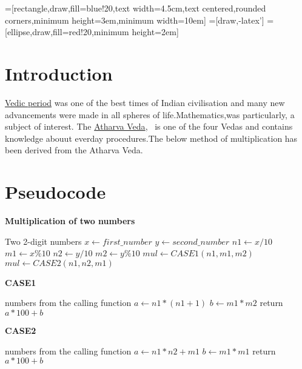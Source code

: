 \documentclass{article}
\begin{document}
\thispagestyle{fancy}
\fancyhf{}

=[rectangle,draw,fill=blue!20,text width=4.5cm,text centered,rounded corners,minimum height=3em,minimum width=10em]
=[draw,-latex']
=[ellipse,draw,fill=red!20,minimum height=2em]

\section{Introduction}
\href{https://en.wikipedia.org/wiki/Vedic_period}{Vedic period} was one of the best times of Indian civilisation and many new advancements were made in all spheres of life.Mathematics,was particularly, a subject of interest. The \href{https://en.wikipedia.org/wiki/Atharvaveda}{Atharva Veda},~\cite{Veda} is one of the four Vedas and contains knowledge abouut everday procedures.The below method of multiplication has been derived from the Atharva Veda.~\cite{commentary}

\section{Pseudocode}
\label{pseudocode}
\begin{algorithm}
\caption{\large\textbf{Multiplication of two numbers}}
\begin{algorithmic}
\REQUIRE Two 2-digit numbers
\STATE $x \leftarrow first\_number$
\STATE $y \leftarrow second\_number$
\STATE $n1 \leftarrow x/10$
\STATE $m1 \leftarrow x\%10$
\STATE $n2 \leftarrow y/10$
\STATE $m2 \leftarrow y\%10$
	\STATE $mul \leftarrow CASE1(n1,m1,m2)$
\ENDIF
{}
	\STATE $mul \leftarrow CASE2(n1,n2,m1)$
\ENDIF
\end{algorithmic}
\end{algorithm}

\begin{algorithm}
\caption{\large\textbf{CASE1}}
\begin{algorithmic}
\label{case1}
 numbers from the calling function
\STATE $a \leftarrow n1*(n1+1)$
\STATE $b \leftarrow m1*m2$
\STATE return $a*100+b$
\end{algorithmic}
\end{algorithm}

\begin{algorithm}
\caption{\large\textbf{CASE2}}
\begin{algorithmic}
\label{case2}
 numbers from the calling function
\STATE $a \leftarrow n1*n2+m1$
\STATE $b \leftarrow m1*m1$
\STATE return $a*100+b$
\end{algorithmic}
\end{algorithm}
\end{document}
